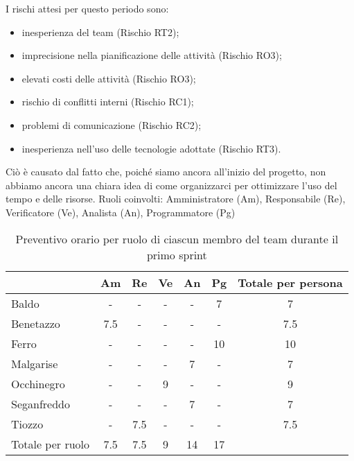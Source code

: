         I rischi attesi per questo periodo sono:
        \begin{itemize}
            \item inesperienza del team (Rischio RT2);
            \item imprecisione nella pianificazione delle attività (Rischio RO3);
            \item elevati costi delle attività (Rischio RO3);
            \item rischio di conflitti interni (Rischio RC1);
            \item problemi di comunicazione (Rischio RC2);
            \item inesperienza nell'uso delle tecnologie adottate (Rischio RT3).
        \end{itemize}
        Ciò è causato dal fatto che, poiché siamo ancora all'inizio del progetto, non abbiamo ancora una chiara idea di come organizzarci per ottimizzare l'uso del tempo e delle risorse.
        \newpage
        Ruoli coinvolti: Amministratore (Am), Responsabile (Re), Verificatore (Ve), Analista (An), Programmatore (Pg)
        \begin{table}[!h]
            \centering
            \begin{tabular}{ |l| c | c | c | c | c | c | } 
                \hline
                \textbf{} & \textbf{Am} & \textbf{Re} & \textbf{Ve} &\textbf{An} & \textbf{Pg} & \textbf{Totale per persona} \\
                \hline 
                Baldo       & - & -   & - & - & 7     & 7       \\ 
                Benetazzo   &  7.5    & - & - & - & - & 7.5     \\ 
                Ferro       & - & -   & - & - & 10     & 10       \\ 
                Malgarise   & - & -   & - & 7 & -     & 7       \\ 
                Occhinegro  & - & -   & 9 & - & -     & 9       \\ 
                Seganfreddo & - & -   & - & 7 & -     & 7       \\
                Tiozzo      & - & 7.5 & - & - & -     & 7.5     \\ 
                \hline
                Totale per ruolo & 7.5 & 7.5 & 9 & 14 & 17 &    \\
                \hline
            \end{tabular}
            \caption{Preventivo orario per ruolo di ciascun membro del team durante il primo sprint}
            \label{tab:1}
        \end{table}

